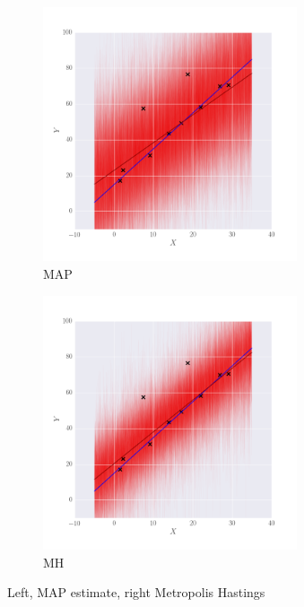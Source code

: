 \begin{figure}
        \centering
        \begin{subfigure}[b]{0.49\textwidth} \centering
              \includegraphics[height=7.5cm]{figs/MAP_linear.png}
              \caption{MAP}
                \label{fig:maplin}
        \end{subfigure}%
        \begin{subfigure}[b]{0.49\textwidth} \centering
            \includegraphics[height=7.5cm]{figs/MH_linear.png}
            \caption{MH}
                \label{fig:mhlin}
        \end{subfigure}%
    
        \caption{Left, MAP estimate, right Metropolis Hastings}\label{fig:BayesVSFreq}
\end{figure}

